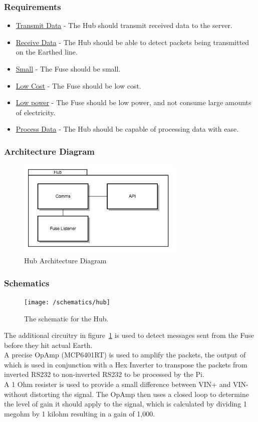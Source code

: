 \documentclass[preprint,12pt,3p]{elsarticle}
\begin{document}
\subsubsection{Requirements}
\begin{itemize}
\item \underline{Transmit Data} - The Hub should transmit received data to the server.
\item \underline{Receive Data} - The Hub should be able to detect packets being transmitted on the Earthed line.
\item \underline{Small} - The Fuse should be small.
\item \underline{Low Cost} - The Fuse should be low cost.
\item \underline{Low power} - The Fuse should be low power, and not consume large amounts of electricity.
\item \underline{Process Data} - The Hub should be capable of processing data with ease.
\end{itemize}
\subsubsection{Architecture Diagram}
\begin{figure}[H]
    \centering
    \includegraphics[width=8cm]{diagrams/hub}
    \caption {Hub Architecture Diagram}
\end{figure}
\subsubsection{Schematics}
\begin{figure}[H]
    \centering
    \texttt{[image: /schematics/hub]}
    \caption{The schematic for the Hub.}
    \label{fig:hubschematic}
\end{figure}
The additional circuitry in figure~\ref{fig:hubschematic} is used to detect messages sent from the Fuse before they hit actual Earth.\\
A precise OpAmp (MCP6401RT) is used to amplify the packets, the output of which is used in conjunction with a Hex Inverter to transpose the packets from inverted RS232 to non-inverted RS232 to be processed by the Pi.\\
A 1 Ohm resister is used to provide a small difference between VIN+ and VIN- without distorting the signal. The OpAmp then uses a closed loop to determine the level of gain it should apply to the signal, which is calculated by dividing 1 megohm by 1 kilohm  resulting in a gain of 1,000.
\end{document}

